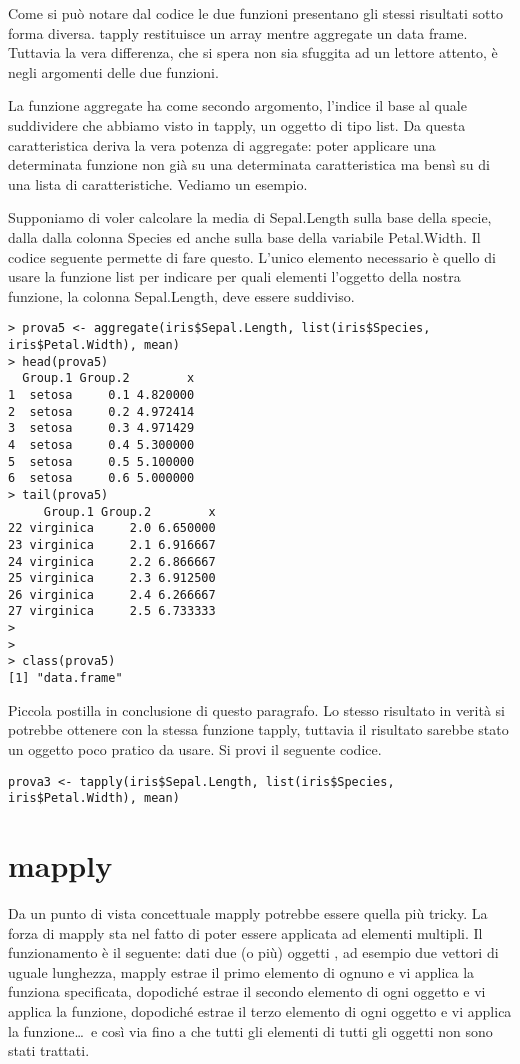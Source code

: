 Come si può notare dal codice le due funzioni presentano gli stessi risultati sotto forma diversa. tapply restituisce un array mentre aggregate un data frame. Tuttavia la vera differenza, che si spera non sia sfuggita ad un lettore attento, è negli argomenti delle due funzioni.

La funzione aggregate ha come secondo argomento, l'indice il base al quale suddividere che abbiamo visto in tapply, un oggetto di tipo list. Da questa caratteristica deriva la vera potenza di aggregate: poter applicare una determinata funzione non già su una determinata caratteristica ma bensì su di una lista di caratteristiche. Vediamo un esempio.

Supponiamo di voler calcolare la media di Sepal.Length sulla base della specie, dalla dalla colonna Species ed anche sulla base della variabile Petal.Width. Il codice seguente permette di fare questo. L'unico elemento necessario è quello di usare la funzione list per indicare per quali elementi l'oggetto della nostra funzione, la colonna Sepal.Length, deve essere suddiviso.
\begin{lstlisting}	
> prova5 <- aggregate(iris$Sepal.Length, list(iris$Species, iris$Petal.Width), mean)
> head(prova5)
  Group.1 Group.2        x
1  setosa     0.1 4.820000
2  setosa     0.2 4.972414
3  setosa     0.3 4.971429
4  setosa     0.4 5.300000
5  setosa     0.5 5.100000
6  setosa     0.6 5.000000
> tail(prova5)
     Group.1 Group.2        x
22 virginica     2.0 6.650000
23 virginica     2.1 6.916667
24 virginica     2.2 6.866667
25 virginica     2.3 6.912500
26 virginica     2.4 6.266667
27 virginica     2.5 6.733333
>
>
> class(prova5)
[1] "data.frame"
\end{lstlisting}

Piccola postilla in conclusione di questo paragrafo. Lo stesso risultato in verità si potrebbe ottenere con la stessa funzione tapply, tuttavia il risultato sarebbe stato un oggetto poco pratico da usare. Si provi il seguente codice.
\begin{lstlisting}	
prova3 <- tapply(iris$Sepal.Length, list(iris$Species, iris$Petal.Width), mean)
\end{lstlisting}

\section{mapply}

Da un punto di vista concettuale \textsf{mapply} potrebbe essere quella più tricky. La forza di \textsf{mapply} sta nel fatto di poter essere applicata ad elementi multipli. Il funzionamento è il seguente: dati due (o più) oggetti \erre, ad esempio due vettori di uguale lunghezza, \textsf{mapply} estrae il primo elemento di ognuno e vi applica la funziona specificata, dopodiché estrae il secondo elemento di ogni oggetto e vi applica la funzione, dopodiché estrae il terzo elemento di ogni oggetto e vi applica la funzione\dots\ e così via fino a che tutti gli elementi di tutti gli oggetti non sono stati trattati.

